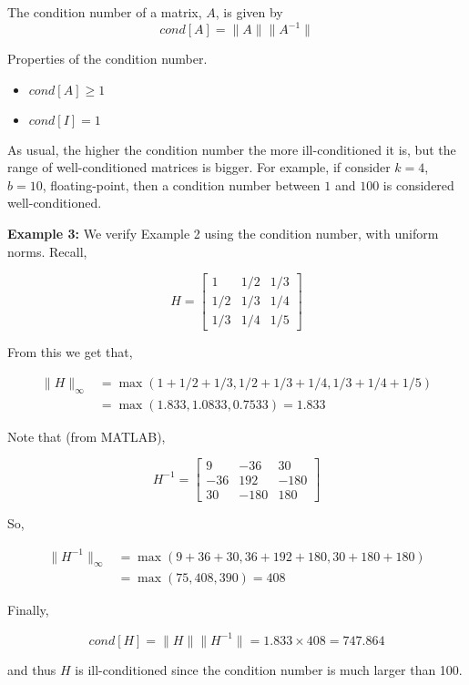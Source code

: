\documentclass [titlepage,12pt,letter] {article}
\begin{document}
The condition number of a matrix, $A$, is given by 
\[cond[A]= \|A\|\|A^{-1}\|\]

Properties of the condition number.
\begin{itemize}
\item{$cond[A] \geq 1$}
\item{$cond[I]=1$}
\end{itemize}

As usual, the higher the condition number the more ill-conditioned it is, but the range of well-conditioned matrices is bigger. For example, if consider $k=4$, $b=10$, floating-point, then a condition number between $1$ and $100$ is considered well-conditioned.

{\bf Example 3:}
We verify Example 2 using the condition number, with uniform norms. Recall,

\[
H=\begin{bmatrix} 1 &	1/2 & 1/3 \\ 1/2	 & 1/3 & 1/4 \\ 1/3 & 1/4 & 1/5 \end{bmatrix}
\]

From this we get that,

\begin{align*}
\|H\|_{\infty}&=\max{(1+1/2+1/3,1/2+1/3+1/4,1/3+1/4+1/5)} \\
&=\max{(1.833,1.0833,0.7533)}=1.833
\end{align*}

Note that (from MATLAB),

\[
H^{-1}=\begin{bmatrix} 9 & -36 & 30 \\ -36 & 192 & -180 \\ 30 & -180 & 180 \end{bmatrix}
\]

So,

\begin{align*}
\|H^{-1}\|_{\infty}&=\max{(9+36+30,36+192+180,30+180+180)} \\
&=\max{(75,408,390)}=408
\end{align*}

Finally,

\[
cond[H]=\|H\|\|H^{-1}\|=1.833 \times 408=747.864
\]

\noindent
and thus $H$ is ill-conditioned since the condition number is much larger than 100.
\end{document}
